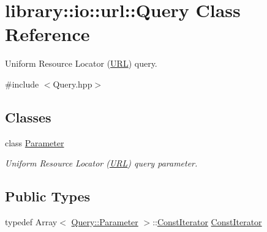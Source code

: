 \hypertarget{classlibrary_1_1io_1_1url_1_1_query}{}\section{library\+:\+:io\+:\+:url\+:\+:Query Class Reference}
\label{classlibrary_1_1io_1_1url_1_1_query}


Uniform Resource Locator (\hyperlink{classlibrary_1_1io_1_1_u_r_l}{U\+RL}) query.  




{\ttfamily \#include $<$Query.\+hpp$>$}

\subsection*{Classes}
\begin{DoxyCompactItemize}
\item 
class \hyperlink{classlibrary_1_1io_1_1url_1_1_query_1_1_parameter}{Parameter}
\begin{DoxyCompactList}\small\item\em Uniform Resource Locator (\hyperlink{classlibrary_1_1io_1_1_u_r_l}{U\+RL}) query parameter. \end{DoxyCompactList}\end{DoxyCompactItemize}
\subsection*{Public Types}
\begin{DoxyCompactItemize}
\item 
typedef Array$<$ \hyperlink{classlibrary_1_1io_1_1url_1_1_query_1_1_parameter}{Query\+::\+Parameter} $>$\+::\hyperlink{classlibrary_1_1io_1_1url_1_1_query_a244b3517cf5a3d1abf7e8c8d9d40cf04}{Const\+Iterator} \hyperlink{classlibrary_1_1io_1_1url_1_1_query_a244b3517cf5a3d1abf7e8c8d9d40cf04}{Const\+Iterator}
\end{DoxyCompactItemize}
